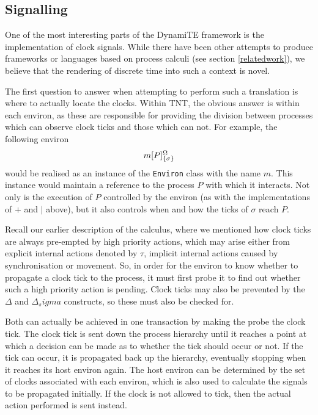 \documentclass{acm_proc_article-sp}
\begin{document}
\subsection{Signalling}
\label{signalling}

One of the most interesting parts of the DynamiTE framework is the
implementation of clock signals.  While there have been other attempts
to produce frameworks or languages based on process calculi (see section
\ref{relatedwork}), we believe that the rendering of discrete time into
such a context is novel.

The first question to answer when attempting to perform such a
translation is where to actually locate the clocks.  Within TNT, the
obvious answer is within each environ, as these are responsible for
providing the division between processes which can observe clock ticks
and those which can not.  For example, the following environ
\begin{displaymath}
{m}[ P ]^{\Omega}_{\{\sigma\}}
\end{displaymath}
would be realised as an instance of the \texttt{Environ} class with the
name $m$.  This instance would maintain a reference to the process $P$
with which it interacts.  Not only is the execution of $P$ controlled by
the environ (as with the implementations of $+$ and $\mid$ above), but
it also controls when and how the ticks of $\sigma$ reach $P$.

Recall our earlier description of the calculus, where we mentioned how
clock ticks are always pre-empted by high priority actions, which may
arise either from explicit internal actions denoted by $\tau$, implicit
internal actions caused by synchronisation or movement.  So, in order
for the environ to know whether to propagate a clock tick to the
process, it must first probe it to find out whether such a high priority
action is pending.  Clock ticks may also be prevented by the $\Delta$
and $\Delta_sigma$ constructs, so these must also be checked for.

Both can actually be achieved in one transaction by making the probe the
clock tick.  The clock tick is sent down the process hierarchy until it
reaches a point at which a decision can be made as to whether the tick
should occur or not.  If the tick can occur, it is propagated back up
the hierarchy, eventually stopping when it reaches its host environ
again.  The host environ can be determined by the set of clocks
associated with each environ, which is also used to calculate the
signals to be propagated initially.  If the clock is not allowed to
tick, then the actual action performed is sent instead.
\end{document}
